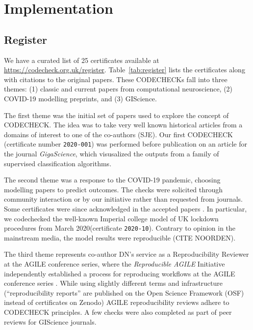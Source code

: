 \documentclass[12pt]{article}
\begin{document}
\section*{Implementation}\label{implementation}

\subsection*{Register}\label{register}

We have a curated list of 25 certificates available at
\url{https://codecheck.org.uk/register}.
Table~\ref{tab:register} lists the certificates
along with citations to the original papers.
These CODECHECKs fall into three themes:
(1) classic and current papers from computational neuroscience,
(2) COVID-19 modelling preprints, and
(3) GIScience.

The first theme was the initial set of papers used to explore the
concept of CODECHECK.  The idea was to take very well known historical
articles from a domains of interest to one of the co-authors (SJE).
Our first CODECHECK (certificate number \texttt{2020-001}) was
performed before publication on an article for the journal
\emph{GigaScience}, which visusalized the outputs from a family of
supervised classification algorithms.


The second theme was a response to the COVID-19 pandemic, choosing
modelling papers to predict outcomes. The checks were solicited
through community interaction or by our initiative rather than
requested from journals.  Some certificates were since acknowledged in
the accepted papers
\cite{Davies2020-vj,kucharski_effectiveness_2020}. In particular, we
codechecked the well-known Imperial college model of UK lockdown
procedures from March 2020(certificate \texttt{2020-10}).  Contrary to
opinion in the mainstream media, the model results were reproducible
(CITE NOORDEN).

The third theme represents co-author DN's service as a Reproducibility
Reviewer at the AGILE conference series, where the \emph{Reproducible
  AGILE} Initiative \cite{reproducible_agile} independently
established a process for reproducing workflows at the AGILE
conference series \cite{nust_improving_2020}.  While using slightly
different terms and infrastructure (``reproducibility reports'' are
published on the Open Science Framework (OSF) instead of certificates
on Zenodo) AGILE reproducibility reviews adhere to CODECHECK
principles.  A few checks were also completed as part of peer reviews
for GIScience journals.
\end{document}
